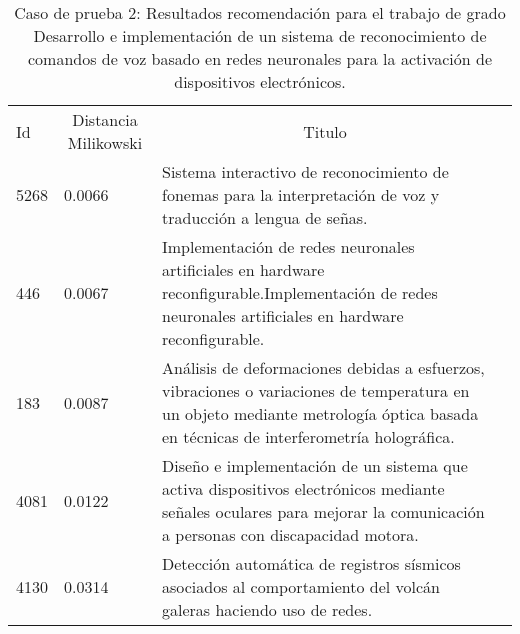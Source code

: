 



\begin{table}[H]\centering
\caption{Caso de prueba 2: Resultados recomendación para el trabajo de grado Desarrollo e implementación de un sistema de reconocimiento de comandos de voz basado en redes neuronales para la activación de dispositivos electrónicos.}\label{tab:tablae2}
	\begin{tabularx}{\textwidth}{XXXm{3.0cm}}\toprule

Id &  \multicolumn{1}{c}{Distancia Milikowski } & \multicolumn{1}{c}{Titulo} \\ 
5268 &0.0066 &Sistema interactivo de reconocimiento de fonemas para la interpretación de voz y traducción a lengua de señas.  \\ 
446 &  0.0067 &Implementación de redes neuronales artificiales en hardware reconfigurable.Implementación de redes neuronales artificiales en hardware reconfigurable.   \\ 
183 & 0.0087 &Análisis de deformaciones debidas a esfuerzos, vibraciones o variaciones de temperatura en un objeto mediante metrología óptica basada en técnicas de interferometría holográfica.   \\ 
4081 &0.0122&Diseño e implementación de un sistema que activa dispositivos electrónicos mediante señales oculares para mejorar la comunicación a personas con discapacidad motora. \\
4130 & 0.0314  &Detección automática de registros sísmicos asociados al comportamiento del volcán galeras haciendo uso de redes. \\ 

 \bottomrule
	\end{tabularx}
	
\end{table}


